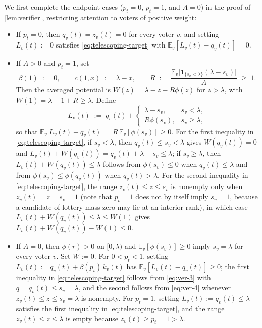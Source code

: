 \documentclass[11pt]{article}
\numberwithin{equation}{section}
\theoremstyle{plain}
\theoremstyle{definition}
\newcommand{\E}{\mathbb{E}}
\newcommand{\1}{\mathbf{1}}
\begin{document}
We first complete the endpoint cases ($p_t = 0$, $p_t = 1$, and $A = 0$) in the proof of \cref{lem:verifier}, restricting attention to voters of positive weight:
\begin{itemize}
  \item If $p_t = 0$, then $q_v(t) = z_v(t) = 0$ for every voter $v$, and setting $L_v(t) := 0$ satisfies \cref{eq:telescoping-target} with $\E_v[L_v(t) - q_v(t)] = 0$.
  \item If $A > 0$ and $p_t = 1$, set
  \[
    \beta(1) \;:=\; 0,
    \qquad
    c(1, x) \;:=\; \lambda - x,
    \qquad
    R \;:=\; \frac{\E_v\bigl[\1_{\{s_v < \lambda\}}(\lambda - s_v)\bigr]}{A} \;\ge\; 1.
  \]
  Then the averaged potential is $W(z) = \lambda - z - R\phi(z)$ for $z > \lambda$, with $W(1) = \lambda - 1 + R \ge \lambda$. Define
  \[
    L_v(t) \;:=\; q_v(t) +
    \begin{cases}
      \lambda - s_v, & s_v < \lambda, \\
      R\phi(s_v), & s_v \ge \lambda,
    \end{cases}
  \]
  so that $\E_v\bigl[L_v(t) - q_v(t)\bigr] = R\,\E_v[\phi(s_v)] \ge 0$. For the first inequality in \cref{eq:telescoping-target}, if $s_v < \lambda$, then $q_v(t) \le s_v < \lambda$ gives $W(q_v(t)) = 0$ and $L_v(t) + W(q_v(t)) = q_v(t) + \lambda - s_v \le \lambda$; if $s_v \ge \lambda$, then $L_v(t) + W(q_v(t)) \le \lambda$ follows from $\phi(s_v) \le 0$ when $q_v(t) \le \lambda$ and from $\phi(s_v) \le \phi(q_v(t))$ when $q_v(t) > \lambda$. For the second inequality in \cref{eq:telescoping-target}, the range $z_v(t) \le z \le s_v$ is nonempty only when $z_v(t) = z = s_v = 1$ (note that $p_t = 1$ does not by itself imply $s_v = 1$, because a candidate of lottery mass zero may lie at an interior rank), in which case $L_v(t) + W(q_v(t)) \le \lambda \le W(1)$ gives $L_v(t) + W(q_v(t)) - W(1) \le 0$.
  \item If $A = 0$, then $\phi(r) > 0$ on $[0, \lambda)$ and $\E_v[\phi(s_v)] \ge 0$ imply $s_v = \lambda$ for every voter $v$. Set $W := 0$. For $0 < p_t < 1$, setting $L_v(t) := q_v(t) + \beta(p_t)\,k_v(t)$ has $\E_v[L_v(t) - q_v(t)] \ge 0$; the first inequality in \cref{eq:telescoping-target} follows from \cref{eq:ver-3} with $q = q_v(t) \le s_v = \lambda$, and the second follows from \cref{eq:ver-4} whenever $z_v(t) \le z \le s_v = \lambda$ is nonempty. For $p_t = 1$, setting $L_v(t) := q_v(t) \le \lambda$ satisfies the first inequality in \cref{eq:telescoping-target}, and the range $z_v(t) \le z \le \lambda$ is empty because $z_v(t) \ge p_t = 1 > \lambda$.
\end{itemize}
\end{document}
